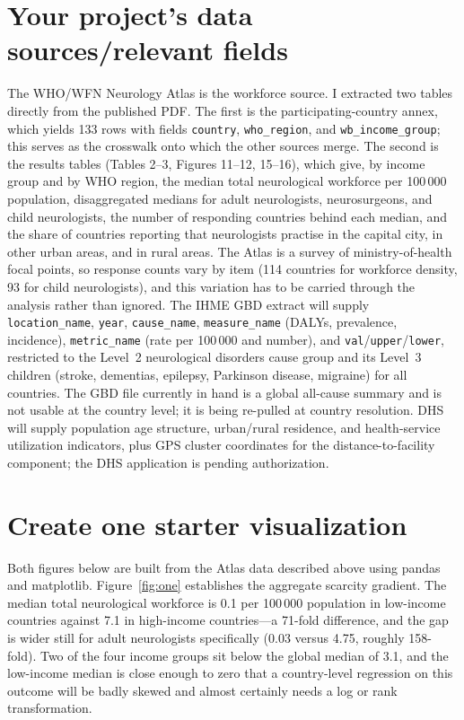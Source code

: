 \documentclass[11pt]{article}
\begin{document}
\section{Your project's data sources/relevant fields}
\label{sec:data}

The WHO/WFN Neurology Atlas is the workforce source. I extracted two tables
directly from the published PDF. The first is the participating-country annex,
which yields 133 rows with fields \texttt{country}, \texttt{who\_region}, and
\texttt{wb\_income\_group}; this serves as the crosswalk onto which the other
sources merge. The second is the results tables (Tables 2--3, Figures 11--12,
15--16), which give, by income group and by WHO region, the median total
neurological workforce per 100\,000 population, disaggregated medians for adult
neurologists, neurosurgeons, and child neurologists, the number of responding
countries behind each median, and the share of countries reporting that
neurologists practise in the capital city, in other urban areas, and in rural
areas. The Atlas is a survey of ministry-of-health focal points, so response
counts vary by item (114 countries for workforce density, 93 for child
neurologists), and this variation has to be carried through the analysis rather
than ignored. The IHME GBD extract will supply \texttt{location\_name},
\texttt{year}, \texttt{cause\_name}, \texttt{measure\_name} (DALYs, prevalence,
incidence), \texttt{metric\_name} (rate per 100\,000 and number), and
\texttt{val}/\texttt{upper}/\texttt{lower}, restricted to the Level~2
neurological disorders cause group and its Level~3 children (stroke, dementias,
epilepsy, Parkinson disease, migraine) for all countries. The GBD file currently
in hand is a global all-cause summary and is not usable at the country level; it
is being re-pulled at country resolution. DHS will supply population age
structure, urban/rural residence, and health-service utilization indicators, plus
GPS cluster coordinates for the distance-to-facility component; the DHS
application is pending authorization.

\section{Create one starter visualization}

Both figures below are built from the Atlas data described above using pandas and
matplotlib. Figure~\ref{fig:one} establishes the aggregate scarcity gradient.
The median total neurological workforce is 0.1 per 100\,000 population in
low-income countries against 7.1 in high-income countries---a 71-fold difference,
and the gap is wider still for adult neurologists specifically (0.03 versus 4.75,
roughly 158-fold). Two of the four income groups sit below the global median of
3.1, and the low-income median is close enough to zero that a country-level
regression on this outcome will be badly skewed and almost certainly needs a log
or rank transformation.
\end{document}
